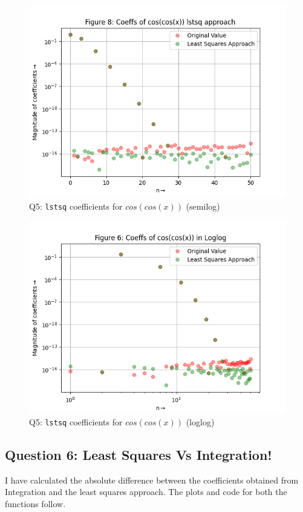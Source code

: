 \documentclass[11pt, a4paper]{article}
\begin{document}
   \begin{figure}[!tbh]
   	\centering
  \includegraphics[scale=0.5]{q5-cos-semilog.png} 
    \caption{Q5: \texttt{lstsq} coefficients for $cos(cos(x))$ (semilog)}
   	\label{fig:lstsq coeff for coscos()}
   \end{figure}
   
   \begin{figure}[!tbh]
   	\centering
  \includegraphics[scale=0.5]{q5-cos-loglog.png} 
    \caption{Q5: \texttt{lstsq} coefficients for $cos(cos(x))$ (loglog)}
   	\label{fig:lstsq coeff for coscos()}
   \end{figure}
   
   \newpage
   \subsection{Question 6: Least Squares Vs Integration!}
   I have calculated the absolute difference between the coefficients obtained from Integration and the least squares approach. The plots and code for both the functions follow.
   
\end{document}
